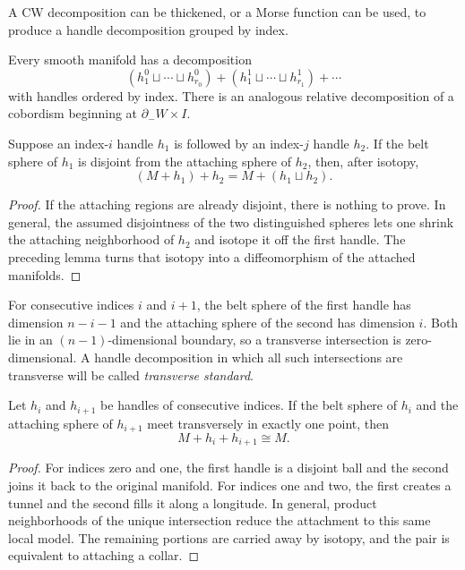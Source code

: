 A CW decomposition can be thickened, or a
Morse function can be used, to produce a
handle decomposition grouped by index.

\begin{theorem}[Whitehead]
\label{at-theorem-indexed-handle-decomp}
Every smooth manifold has a decomposition
$$
(h^0_1\sqcup\cdots\sqcup h^0_{r_0})+
(h^1_1\sqcup\cdots\sqcup h^1_{r_1})+
\cdots
$$
with handles ordered by index.  There is an
analogous relative decomposition of a
cobordism beginning at
$\partial_-W\times I$.
\end{theorem}

\begin{lemma}
\label{at-lemma-simultaneous-handles}
Suppose an index-$i$ handle $h_1$ is followed
by an index-$j$ handle $h_2$.  If the belt
sphere of $h_1$ is disjoint from the
attaching
sphere of $h_2$, then, after isotopy,
$$
(M+h_1)+h_2=M+(h_1\sqcup h_2).
$$
\end{lemma}

\begin{proof}
If the attaching regions are already
disjoint, there is nothing to prove.  In
general, the assumed disjointness of the two
distinguished spheres lets one shrink the
attaching neighborhood of $h_2$ and isotope
it off the first handle.  The preceding lemma
turns that isotopy into a diffeomorphism of
the attached manifolds.
\end{proof}

For consecutive indices $i$ and $i+1$, the
belt sphere of the first handle has dimension
$n-i-1$ and the attaching sphere of the
second has dimension $i$.  Both lie in an
$(n-1)$-dimensional boundary, so a transverse
intersection is zero-dimensional.  A handle
decomposition in which all such intersections
are transverse will be called
\emph{transverse standard}.

\begin{lemma}
\label{at-lemma-handle-cancellation}
Let $h_i$ and $h_{i+1}$ be handles of
consecutive indices.  If the belt sphere of
$h_i$ and the attaching sphere of $h_{i+1}$
meet transversely in exactly one point, then
$$
M+h_i+h_{i+1}\cong M.
$$
\end{lemma}

\begin{proof}
For indices zero and one, the first handle is
a disjoint ball and the second joins it back
to the original manifold.  For indices one
and two, the first creates a tunnel and the
second fills it along a longitude.  In
general, product neighborhoods of the unique
intersection reduce the attachment to this
same local model.  The remaining portions
are carried away by isotopy, and the pair is
equivalent to attaching a collar.
\end{proof}

